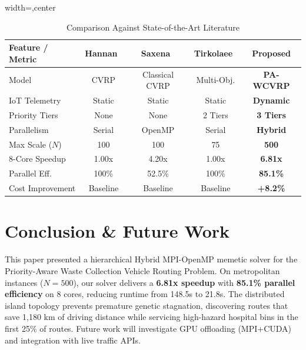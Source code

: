 \documentclass[conference]{IEEEtran}
\begin{document}
\begin{table}[htbp]
\centering
\caption{Comparison Against State-of-the-Art Literature}
\label{tab:comparison}
\setlength{\tabcolsep}{3pt}
\begin{adjustbox}{width=\columnwidth,center}
\begin{tabular}{lcccc}
\toprule
\textbf{Feature / Metric} & \textbf{Hannan~\cite{hannan2018capacitated}} & \textbf{Saxena~\cite{saxena2020optimized}} & \textbf{Tirkolaee~\cite{tirkolaee2023novel}} & \textbf{Proposed} \\
\midrule
Model & CVRP & Classical CVRP & Multi-Obj. & \textbf{PA-WCVRP} \\
IoT Telemetry & Static & Static & Static & \textbf{Dynamic} \\
Priority Tiers & None & None & 2 Tiers & \textbf{3 Tiers} \\
Parallelism & Serial & OpenMP & Serial & \textbf{Hybrid} \\
Max Scale ($N$) & 100 & 100 & 75 & \textbf{500} \\
8-Core Speedup & 1.00x & 4.20x & 1.00x & \textbf{6.81x} \\
Parallel Eff. & 100\% & 52.5\% & 100\% & \textbf{85.1\%} \\
Cost Improvement & Baseline & Baseline & Baseline & \textbf{+8.2\%} \\
\bottomrule
\end{tabular}
\end{adjustbox}
\end{table}

\section{Conclusion \& Future Work}
This paper presented a hierarchical Hybrid MPI-OpenMP memetic solver for the Priority-Aware Waste Collection Vehicle Routing Problem. On metropolitan instances ($N=500$), our solver delivers a \textbf{6.81x speedup} with \textbf{85.1\% parallel efficiency} on 8 cores, reducing runtime from 148.5s to 21.8s. The distributed island topology prevents premature genetic stagnation, discovering routes that save 1,180 km of driving distance while servicing high-hazard hospital bins in the first 25\% of routes. Future work will investigate GPU offloading (MPI+CUDA) and integration with live traffic APIs.



\end{document}
